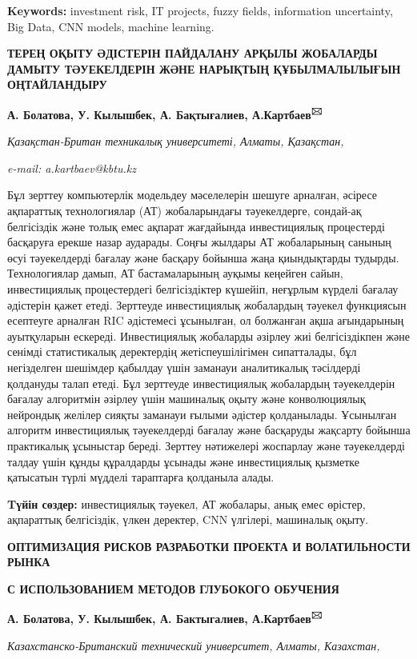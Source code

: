 \documentclass[
]{article}
\begin{document}
\textbf{Keywords:} investment risk, IT projects, fuzzy fields,
information uncertainty, Big Data, CNN models, machine learning.

\textbf{ТЕРЕҢ ОҚЫТУ ӘДІСТЕРІН ПАЙДАЛАНУ АРҚЫЛЫ ЖОБАЛАРДЫ ДАМЫТУ
ТӘУЕКЕЛДЕРІН ЖӘНЕ НАРЫҚТЫҢ ҚҰБЫЛМАЛЫЛЫҒЫН ОҢТАЙЛАНДЫРУ}

\textbf{А. Болатова, У. Кылышбек, А. Бақтығалиев,
А.Картбаев\textsuperscript{🖂}}

\emph{Қазақстан-Британ техникалық университеті, Алматы, Қазақстан,}

\emph{e-mail: a.kartbaev@kbtu.kz}

Бұл зерттеу компьютерлік модельдеу мәселелерін шешуге арналған, әсіресе
ақпараттық технологиялар (АТ) жобаларындағы тәуекелдерге, сондай-ақ
белгісіздік және толық емес ақпарат жағдайында инвестициялық процестерді
басқаруға ерекше назар аударады. Соңғы жылдары АТ жобаларының санының
өсуі тәуекелдерді бағалау және басқару бойынша жаңа қиындықтарды
тудырды. Технологиялар дамып, АТ бастамаларының ауқымы кеңейген сайын,
инвестициялық процестердегі белгісіздіктер күшейіп, неғұрлым күрделі
бағалау әдістерін қажет етеді. Зерттеуде инвестициялық жобалардың
тәуекел функциясын есептеуге арналған RIC әдістемесі ұсынылған, ол
болжанған ақша ағындарының ауытқуларын ескереді. Инвестициялық жобаларды
әзірлеу жиі белгісіздікпен және сенімді статистикалық деректердің
жетіспеушілігімен сипатталады, бұл негізделген шешімдер қабылдау үшін
заманауи аналитикалық тәсілдерді қолдануды талап етеді. Бұл зерттеуде
инвестициялық жобалардың тәуекелдерін бағалау алгоритмін әзірлеу үшін
машиналық оқыту және конволюциялық нейрондық желілер сияқты заманауи
ғылыми әдістер қолданылады. Ұсынылған алгоритм инвестициялық
тәуекелдерді бағалау және басқаруды жақсарту бойынша практикалық
ұсыныстар береді. Зерттеу нәтижелері жоспарлау және тәуекелдерді талдау
үшін құнды құралдарды ұсынады және инвестициялық қызметке қатысатын
түрлі мүдделі тараптарға қолданыла алады.

\textbf{Tүйін сөздер:} инвестициялық тәуекел, АТ жобалары, анық емес
өрістер, ақпараттық белгісіздік, үлкен деректер, CNN үлгілері, машиналық
оқыту.

\textbf{ОПТИМИЗАЦИЯ РИСКОВ РАЗРАБОТКИ ПРОЕКТА И ВОЛАТИЛЬНОСТИ РЫНКА}

\textbf{С ИСПОЛЬЗОВАНИЕМ МЕТОДОВ ГЛУБОКОГО ОБУЧЕНИЯ}

\textbf{А. Болатова, У. Кылышбек, А. Бактыгалиев,
А.Картбаев\textsuperscript{🖂}}

\emph{Казахстанско-Британский технический университет, Алматы,
Казахстан,}
\end{document}
